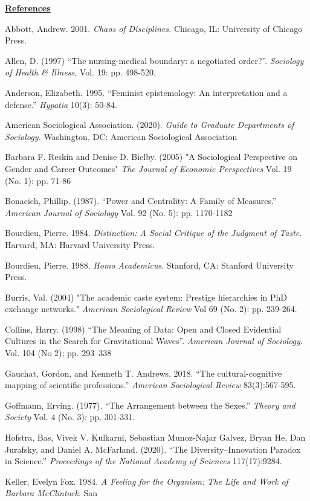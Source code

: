 \documentclass{article}
\begin{document}
\textbf{\uline{References}}

Abbott, Andrew. 2001. \emph{Chaos of Disciplines.} Chicago, IL:
University of Chicago Press.

Allen, D. (1997) ``The nursing-medical boundary: a negotiated order?''.
\emph{Sociology of Health \& Illness}, Vol. 19: pp. 498-520.

Anderson, Elizabeth. 1995. ``Feminist epistemology: An interpretation
and a defense.'' \emph{Hypatia} 10(3): 50-84.

American Sociological Association. (2020). \emph{Guide to Graduate
Departments of Sociology.} Washington, DC: American Sociological
Association

Barbara F. Reskin and Denise D. Bielby. (2005) "A Sociological
Perspective on Gender and Career Outcomes" \emph{The Journal of Economic
Perspectives} Vol. 19 (No. 1): pp. 71-86

Bonacich, Phillip. (1987). ``Power and Centrality: A Family of
Measures.'' \emph{American Journal of Sociology} Vol. 92 (No. 5): pp.
1170-1182

Bourdieu, Pierre. 1984. \emph{Distinction: A Social Critique of the
Judgment of Taste}. Harvard, MA: Harvard University Press.

Bourdieu, Pierre. 1988. \emph{Homo Academicus}. Stanford, CA: Stanford
University Press.

Burris, Val. (2004) "The academic caste system: Prestige hierarchies in
PhD exchange networks." \emph{American Sociological Review} Vol 69 (No.
2): pp. 239-264.

Collins, Harry. (1998) ``The Meaning of Data: Open and Closed Evidential
Cultures in the Search for Gravitational Waves''. \emph{American Journal
of Sociology}. Vol. 104 (No 2); pp. 293--338

Gauchat, Gordon, and Kenneth T. Andrews. 2018. ``The cultural-cognitive
mapping of scientific professions.'' \emph{American Sociological Review}
83(3):567-595.

Goffmann, Erving. (1977). ``The Arrangement between the Sexes.''
\emph{Theory and Society} Vol. 4 (No. 3): pp. 301-331.

Hofstra, Bas, Vivek V. Kulkarni, Sebastian Munoz-Najar Galvez, Bryan He,
Dan Jurafsky, and Daniel A. McFarland. (2020). ``The
Diversity--Innovation Paradox in Science.'' \emph{Proceedings of the
National Academy of Sciences} 117(17):9284.

Keller, Evelyn Fox. 1984. \emph{A Feeling for the Organism: The Life and
Work of Barbara McClintock}. San
\end{document}
